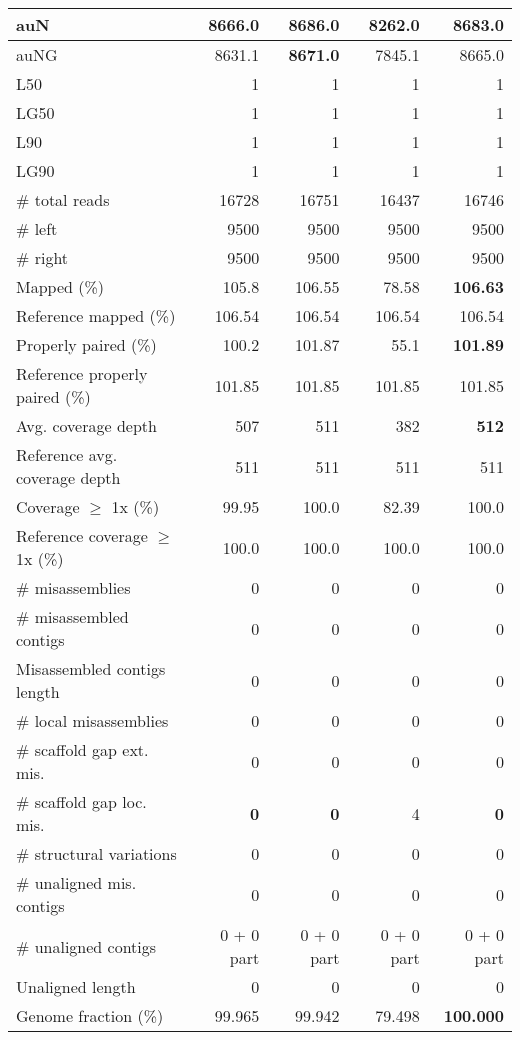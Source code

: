 \documentclass[12pt,a4paper]{article}
\begin{document}
\begin{table}[ht]
\begin{center}
\begin{tabular}{|l*{4}{|r}|}
auN & 8666.0 & {\bf 8686.0} & 8262.0 & 8683.0 \\ \hline
auNG & 8631.1 & {\bf 8671.0} & 7845.1 & 8665.0 \\ \hline
L50 & 1 & 1 & 1 & 1 \\ \hline
LG50 & 1 & 1 & 1 & 1 \\ \hline
L90 & 1 & 1 & 1 & 1 \\ \hline
LG90 & 1 & 1 & 1 & 1 \\ \hline
\# total reads & 16728 & 16751 & 16437 & 16746 \\ \hline
\# left & 9500 & 9500 & 9500 & 9500 \\ \hline
\# right & 9500 & 9500 & 9500 & 9500 \\ \hline
Mapped (\%) & 105.8 & 106.55 & 78.58 & {\bf 106.63} \\ \hline
Reference mapped (\%) & 106.54 & 106.54 & 106.54 & 106.54 \\ \hline
Properly paired (\%) & 100.2 & 101.87 & 55.1 & {\bf 101.89} \\ \hline
Reference properly paired (\%) & 101.85 & 101.85 & 101.85 & 101.85 \\ \hline
Avg. coverage depth & 507 & 511 & 382 & {\bf 512} \\ \hline
Reference avg. coverage depth & 511 & 511 & 511 & 511 \\ \hline
Coverage $\geq$ 1x (\%) & 99.95 & 100.0 & 82.39 & 100.0 \\ \hline
Reference coverage $\geq$ 1x (\%) & 100.0 & 100.0 & 100.0 & 100.0 \\ \hline
\# misassemblies & 0 & 0 & 0 & 0 \\ \hline
\# misassembled contigs & 0 & 0 & 0 & 0 \\ \hline
Misassembled contigs length & 0 & 0 & 0 & 0 \\ \hline
\# local misassemblies & 0 & 0 & 0 & 0 \\ \hline
\# scaffold gap ext. mis. & 0 & 0 & 0 & 0 \\ \hline
\# scaffold gap loc. mis. & {\bf 0} & {\bf 0} & 4 & {\bf 0} \\ \hline
\# structural variations & 0 & 0 & 0 & 0 \\ \hline
\# unaligned mis. contigs & 0 & 0 & 0 & 0 \\ \hline
\# unaligned contigs & 0 + 0 part & 0 + 0 part & 0 + 0 part & 0 + 0 part \\ \hline
Unaligned length & 0 & 0 & 0 & 0 \\ \hline
Genome fraction (\%) & 99.965 & 99.942 & 79.498 & {\bf 100.000} \\ \hline

\end{tabular}
\end{center}
\end{table}
\end{document}
